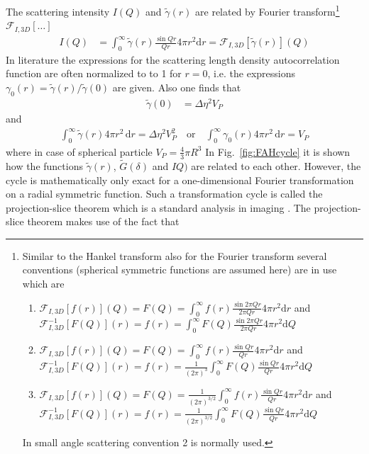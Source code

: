 The scattering intensity $I(Q)$ and  $\tilde{\gamma}(r)$ are related by Fourier transform\footnote{\label{footnote:Fourier}Similar to the Hankel transform also for the Fourier transform several conventions (spherical symmetric functions are assumed here) are in use which are
\begin{enumerate}
\item $\mathcal{F}_{I,3D}[f(r)](Q)=F(Q)=\int_0^\infty f(r) \frac{\sin 2\pi Qr}{2\pi Qr}4\pi r^2\mathrm{d}r$ and \\ $\mathcal{F}_{I,3D}^{-1}[F(Q)](r)=f(r)=\int_0^\infty F(Q) \frac{\sin 2\pi Qr}{2\pi Qr}4\pi r^2\mathrm{d}Q$
\item $\mathcal{F}_{I,3D}[f(r)](Q)=F(Q)=\int_0^\infty f(r) \frac{\sin Qr}{Qr}4\pi r^2\mathrm{d}r$ and \\ $\mathcal{F}_{I,3D}^{-1}[F(Q)](r)=f(r)=\frac{1}{(2\pi)^3}\int_0^\infty F(Q) \frac{\sin Qr}{Qr}4\pi r^2\mathrm{d}Q$
\item $\mathcal{F}_{I,3D}[f(r)](Q)=F(Q)=\frac{1}{(2\pi)^{3/2}}\int_0^\infty f(r) \frac{\sin Qr}{ Qr}4\pi r^2\mathrm{d}r$ and \\ $\mathcal{F}_{I,3D}^{-1}[F(Q)](r)=f(r)=\frac{1}{(2\pi)^{3/2}}\int_0^\infty F(Q) \frac{\sin Qr}{Qr}4\pi r^2\mathrm{d}Q$
\end{enumerate}
In small angle scattering convention 2 is normally used.
} $\mathcal{F}_{I,3D}[\ldots]$
\begin{align}
I(Q) &= \int_0^\infty \tilde{\gamma}(r) \frac{\sin Qr}{Qr}4\pi r^2\mathrm{d}r =
\mathcal{F}_{I,3D}\left[\tilde{\gamma}(r)\right](Q)
\end{align}
In literature the expressions for the scattering length density autocorrelation function are often normalized to to 1 for $r=0$, i.e. the expressions $\gamma_0(r)=\tilde{\gamma}(r)/\tilde{\gamma}(0)$ are given. Also one finds that
\begin{align}
\tilde{\gamma}(0)&=\Delta\eta^2 V_P
\end{align}
and
\begin{align}
\int_0^\infty \tilde{\gamma}(r) 4\pi r^2 \, \mathrm{d}r =\Delta\eta^2 V_P^2 \quad \mbox{or} \quad  \int_0^\infty \gamma_0(r) 4\pi r^2 \, \mathrm{d}r = V_P
\end{align}
where in case of spherical particle $V_P=\frac43 \pi R^3$
In Fig.\ \ref{fig:FAHcycle} it is shown how the functions $\tilde{\gamma}(r)$, $\tilde{G}(\delta)$ and $IQ)$ are related to each other. However, the cycle is mathematically only exact for a one-dimensional Fourier transformation on a radial symmetric function. Such a transformation cycle is called the projection-slice theorem which is a standard analysis in imaging \cite{Bracewell2003, Bracewell1956}. The projection-slice theorem makes use of the fact that
